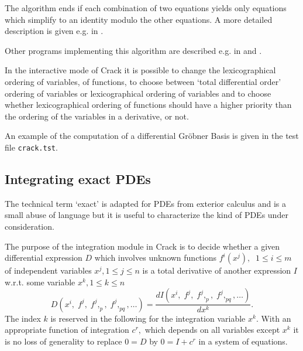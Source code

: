 \documentclass[12pt]{article}
\begin{document}
The algorithm ends if each combination of two equations yields only equations
which simplify to an identity modulo the other equations.
A more detailed description is given e.g. in \cite{Alex,Reid1}.

Other programs implementing this algorithm are described e.g. in
\cite{FS,Alex,Fush,Reid1,Reid2,Reid3} and \cite{Mans}.

In the interactive mode of {\sc Crack} it is possible to change the
lexicographical ordering of variables, of functions, to choose between
`total differential order' ordering of variables or lexicographical
ordering of variables and to choose whether lexicographical ordering
of functions should have a higher priority than the ordering of the
variables in a derivative, or not.

An example of the computation of a differential Gr\"{o}bner Basis is
given in the test file {\tt crack.tst}.

\subsection{Integrating exact PDEs}
The technical term `exact' is adapted for PDEs from exterior calculus and
is a small abuse of language but it is useful to characterize the kind of PDEs
under consideration.

The purpose of the integration module in {\sc Crack} is to  decide
whether a given differential
expression $D$ which involves unknown functions $f^i(x^j),\;\; 1\leq i\leq m$ 
of independent variables $x^j, 1\leq j\leq n$
is a total derivative of another expression $I$
w.r.t. some variable $x^k, 1\leq k\leq n$ 
\[ D(x^i,\; f^j,\; f^j,_p,\; f^j,_{pq}, \ldots) 
     = \frac{d I(x^i,\; f^j,\; f^j,_p,\; f^j,_{pq}, \ldots)}{d x^k}. \]
The index $k$ is
reserved in the following for the integration variable $x^k.$
With an appropriate function of integration $c^r,$
which depends on all variables except $x^k$ it is no loss of generality
to replace $0 = D$ by $0 = I + c^r$ in a system of equations.
\end{document}
